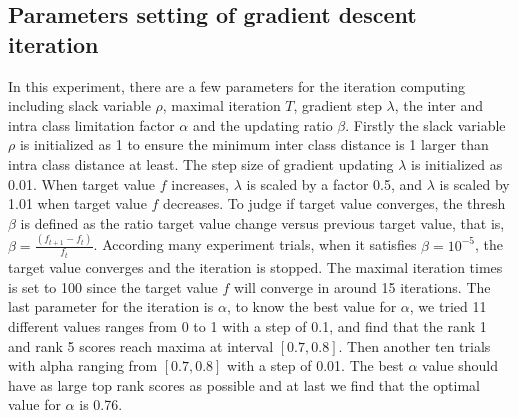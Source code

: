 \documentclass[conference,compsoc]{IEEEtran}
\begin{document}
\subsection{Parameters setting of gradient descent iteration}
In this experiment, there are a few parameters for the iteration computing including slack variable $\rho$, maximal iteration $T$, gradient step $\lambda$, the inter and intra class limitation factor $\alpha$ and the updating ratio $\beta$. Firstly the slack variable $\rho$ is initialized as 1 to ensure the minimum inter class distance is 1 larger than intra class distance at least. The step size of gradient updating $\lambda$ is initialized as 0.01. When target value $f$ increases,  $\lambda$ is scaled by a factor 0.5, and  $\lambda$ is scaled by 1.01 when target value $f$ decreases. To judge if target value converges, the thresh $\beta$ is defined as the ratio target value change versus previous target value, that is, $\beta = \frac{(f_{t+1}-f_t)}{f_t}$. According many experiment trials, when it satisfies $\beta = 10^{-5}$, the target value converges and the iteration is stopped. The maximal iteration times is set to 100 since the target value $f$ will converge in around 15 iterations.  The last parameter for the iteration is $\alpha$, to know the best value for $\alpha$, we tried 11 different values ranges from 0 to 1 with a step of 0.1, and find that the rank 1 and rank 5 scores reach maxima at interval $[0.7,0.8]$. Then another ten trials with alpha ranging from $[0.7,0.8]$ with a step of 0.01. The best $\alpha$ value should have as large top rank scores as possible and at last we find that the optimal value for $\alpha$ is 0.76.

\end{document}
